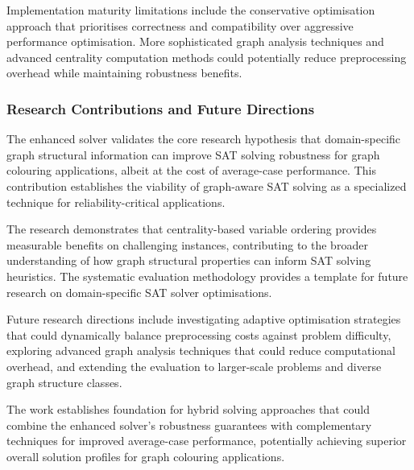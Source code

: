 Implementation maturity limitations include the conservative optimisation approach that prioritises correctness and compatibility over aggressive performance optimisation. More sophisticated graph analysis techniques and advanced centrality computation methods could potentially reduce preprocessing overhead while maintaining robustness benefits.

\subsubsection{Research Contributions and Future Directions}

The enhanced solver validates the core research hypothesis that domain-specific graph structural information can improve SAT solving robustness for graph colouring applications, albeit at the cost of average-case performance. This contribution establishes the viability of graph-aware SAT solving as a specialized technique for reliability-critical applications.

The research demonstrates that centrality-based variable ordering provides measurable benefits on challenging instances, contributing to the broader understanding of how graph structural properties can inform SAT solving heuristics. The systematic evaluation methodology provides a template for future research on domain-specific SAT solver optimisations.

Future research directions include investigating adaptive optimisation strategies that could dynamically balance preprocessing costs against problem difficulty, exploring advanced graph analysis techniques that could reduce computational overhead, and extending the evaluation to larger-scale problems and diverse graph structure classes.

The work establishes foundation for hybrid solving approaches that could combine the enhanced solver's robustness guarantees with complementary techniques for improved average-case performance, potentially achieving superior overall solution profiles for graph colouring applications.